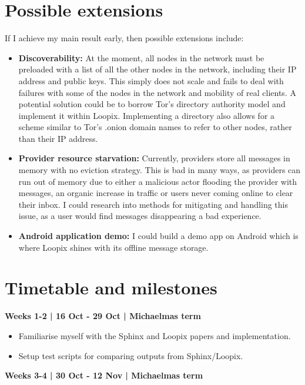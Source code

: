 \documentclass[12pt,a4paper,twoside]{article}
\begin{document}
	
	\section*{Possible extensions}
	
	If I achieve my main result early, then possible extensions include:
	
	\begin{itemize}
		\item \textbf{Discoverability:} At the moment, all nodes in the network must be preloaded with a list of all the other nodes in the network, including their IP address and public keys. This simply does not scale and fails to deal with failures with some of the nodes in the network and mobility of real clients. A potential solution could be to borrow Tor's directory authority model and implement it within Loopix. Implementing a directory also allows for a scheme similar to Tor's .onion domain names to refer to other nodes, rather than their IP address.
		\item \textbf{Provider resource starvation:} Currently, providers store all messages in memory with no eviction strategy. This is bad in many ways, as providers can run out of memory due to either a malicious actor flooding the provider with messages, an organic increase in traffic or users never coming online to clear their inbox. I could research into methods for mitigating and handling this issue, as a user would find messages disappearing a bad experience.
		\item \textbf{Android application demo:} I could build a demo app on Android which is where Loopix shines with its offline message storage.
	\end{itemize}
	
	
	\section*{Timetable and milestones}
	
	\textbf{Weeks 1-2 | 16 Oct - 29 Oct | Michaelmas term}
	
	\begin{itemize}
		\item Familiarise myself with the Sphinx and Loopix papers and implementation.
		\item Setup test scripts for comparing outputs from Sphinx/Loopix.
	\end{itemize}
	
	\textbf{Weeks 3-4 | 30 Oct - 12 Nov | Michaelmas term}
	
\end{document}
